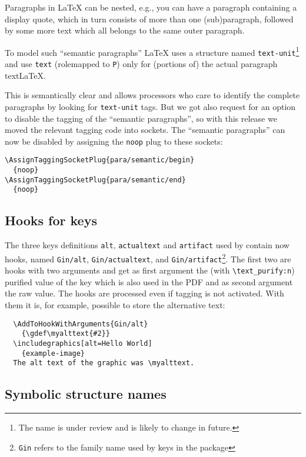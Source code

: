 \documentclass{ltnews}
\begin{document}
Paragraphs in \LaTeX{} can be nested, e.g., you can have a paragraph
containing a display quote, which in turn consists of more than one
(sub)paragraph, followed by some more text which all belongs to the
same outer paragraph.

To model such \enquote{semantic paragraphs} \LaTeX{} uses a structure
named \texttt{text-unit}\footnote{The name is under review and is
likely to change in future.}  and use \texttt{text} (rolemapped to
\texttt{P}) only for (portions of) the actual paragraph text\LaTeX{}.

This is semantically clear and allows processors who care to identify
the complete paragraphs by looking for \texttt{text-unit} tags.  But
we got also request for an option to disable the tagging of the
\enquote{semantic paragraphs}, so with this release we moved the
relevant tagging code into sockets. The \enquote{semantic paragraphs}
can now be disabled by assigning the \texttt{noop} plug to these
sockets:
\begin{verbatim}
\AssignTaggingSocketPlug{para/semantic/begin}
  {noop}
\AssignTaggingSocketPlug{para/semantic/end}
  {noop}
\end{verbatim}

\subsection{Hooks for  keys}

The three keys definitions \texttt{alt}, \texttt{actualtext} and
\texttt{artifact} used by  contain now hooks,
named \texttt{Gin/alt}, \texttt{Gin/actualtext}, and
\texttt{Gin/artifact}\footnote{\texttt{Gin} refers to the family name
used by keys in the  package}.  The first two are hooks
with two arguments and get as first argument the (with
\verb+\text_purify:n+) purified value of the key which is also used in
the PDF and as second argument the raw value.  The hooks are processed
even if tagging is not activated.  With them it is, for example,
possible to store the alternative text:
\begin{verbatim}
  \AddToHookWithArguments{Gin/alt}
    {\gdef\myalttext{#2}}
  \includegraphics[alt=Hello World]
    {example-image}
  The alt text of the graphic was \myalttext.
\end{verbatim}


\subsection{Symbolic structure names}
\end{document}

